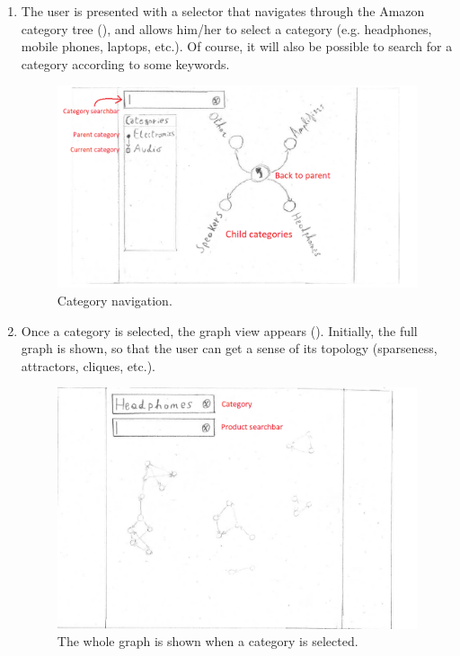 \documentclass[a4paper,12pt]{article}
\begin{document}
\begin{enumerate}
	\item The user is presented with a selector that navigates through the Amazon category tree (), and allows him/her to select a category (e.g. headphones, mobile phones, laptops, etc.). Of course, it will also be possible to search for a category according to some keywords.
	\begin{figure}[H]
		\centering{}
		\includegraphics[width=\textwidth]{img/categories.png}
		\caption{Category navigation.}
		\label{fig:category}
	\end{figure}
	\item Once a category is selected, the graph view appears (). Initially, the full graph is shown, so that the user can get a sense of its topology (sparseness, attractors, cliques, etc.).
		\begin{figure}[H]
		\centering{}
		\includegraphics[width=\textwidth]{img/graph.png}
		\caption{The whole graph is shown when a category is selected.}

\end{figure}
\end{enumerate}
\end{document}
